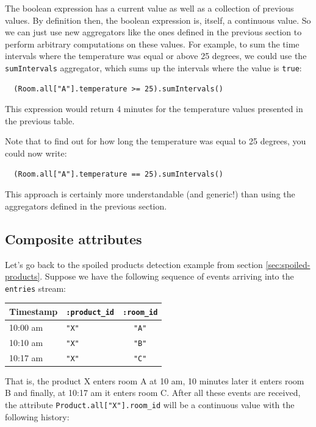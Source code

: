 \documentclass{report}
\begin{document}
The boolean expression has a current value as well as a collection of
previous values. By definition then, the boolean expression is,
itself, a continuous value. So we can just use new aggregators like
the ones defined in the previous section to perform arbitrary
computations on these values. For example, to sum the time intervals
where the temperature was equal or above 25 degrees, we could use the
\verb=sumIntervals= aggregator, which sums up the intervals where the
value is \verb=true=:

\begin{lstlisting}
  (Room.all["A"].temperature >= 25).sumIntervals()
\end{lstlisting}

This expression would return 4 minutes for the temperature values
presented in the previous table.

Note that to find out for how long the temperature was equal to 25
degrees, you could now write:

\begin{lstlisting}
  (Room.all["A"].temperature == 25).sumIntervals()
\end{lstlisting}

This approach is certainly more understandable (and generic!) than
using the aggregators defined in the previous section.

\subsection{Composite attributes}

Let's go back to the spoiled products detection example from section
\ref{sec:spoiled-products}. Suppose we have the following
sequence of events arriving into the \verb=entries= stream:

\begin{tabular}{ |l|l|c| }
  \hline
  Timestamp & \verb=:product_id= & \verb=:room_id= \\
  \hline
  10:00 am & \verb="X"= & \verb="A"= \\
  10:10 am & \verb="X"= & \verb="B"= \\
  10:17 am & \verb="X"= & \verb="C"= \\
  \hline
\end{tabular}

That is, the product X enters room A at 10 am, 10 minutes later it
enters room B and finally, at 10:17 am it enters room C. After all
these events are received, the attribute
\verb=Product.all["X"].room_id= will be a continuous value with the
following history:
\end{document}
